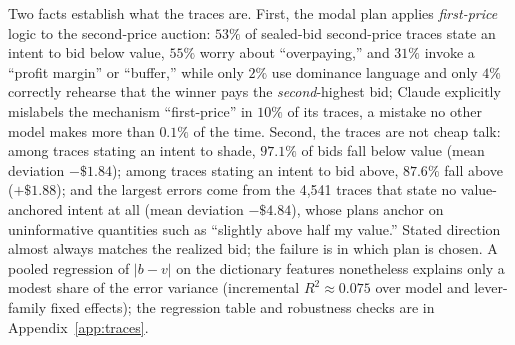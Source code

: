 Two facts establish what the traces are. First, the modal plan applies
\emph{first-price} logic to the second-price auction: $53\%$ of sealed-bid
second-price traces state an intent to bid below value, $55\%$ worry about
``overpaying,'' and $31\%$ invoke a ``profit margin'' or ``buffer,'' while
only $2\%$ use dominance language and only $4\%$ correctly rehearse that the
winner pays the \emph{second}-highest bid; Claude explicitly mislabels the
mechanism ``first-price'' in $10\%$ of its traces, a mistake no other model
makes more than $0.1\%$ of the time. Second, the traces are not cheap talk:
among traces stating an intent to shade, $97.1\%$ of bids fall below value
(mean deviation $-\$1.84$); among traces stating an intent to bid above,
$87.6\%$ fall above ($+\$1.88$); and the largest errors come from the
4{,}541 traces that state no value-anchored intent at all (mean deviation
$-\$4.84$), whose plans anchor on uninformative quantities such as
``slightly above half my value.'' Stated direction almost always matches the
realized bid; the failure is in which plan is chosen. A pooled regression of
$|b - v|$ on the dictionary features nonetheless explains only a modest share
of the error variance (incremental $R^{2} \approx 0.075$ over model and
lever-family fixed effects); the regression table and robustness checks are
in Appendix~\ref{app:traces}.

